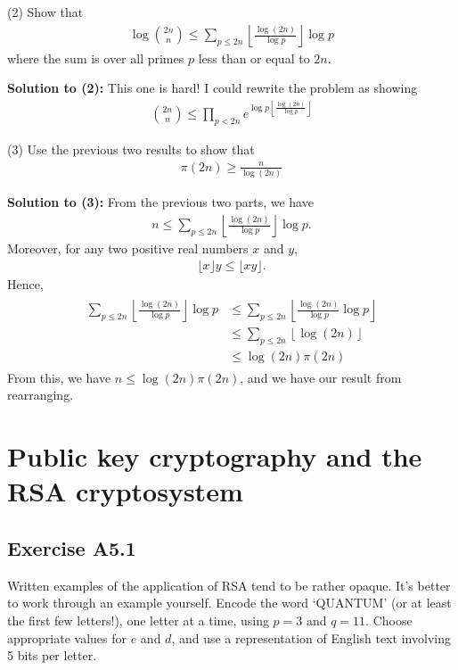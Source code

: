 \documentclass{book}
\begin{document}
    (2) Show that
    \begin{align}
        \log \binom{2n}{n} \leq \sum_{p\leq2n} \left\lfloor\frac{\log(2n)}{\log p} \right\rfloor\log p
    \end{align}
    where the sum is over all primes $p$ less than or equal to $2n$.

    \textbf{Solution to (2):} This one is hard! I could rewrite the problem as showing
    \begin{align}
        \binom{2n}{n} \leq \prod_{p<2n}e^{\log p \left\lfloor\frac{\log(2n)}{\log p}\right\rfloor}
    \end{align}

    (3) Use the previous two results to show that
    \begin{align}
        \pi(2n) \geq \frac{n}{\log(2n)}
    \end{align}

    \textbf{Solution to (3):} From the previous two parts, we have
    \begin{align}
        n \leq \sum_{p\leq2n} \left\lfloor\frac{\log(2n)}{\log p} \right\rfloor\log p.
    \end{align}
    Moreover, for any two positive real numbers $x$ and $y$,
    \begin{align}
        \lfloor x\rfloor y \leq \lfloor x y\rfloor.
    \end{align}
    Hence,
    \begin{align}
    \begin{aligned}
        \sum_{p\leq2n} \left\lfloor\frac{\log(2n)}{\log p} \right\rfloor\log p &\leq \sum_{p\leq2n} \left\lfloor\frac{\log(2n)}{\log p }\log p\right\rfloor \\
        &\leq \sum_{p\leq2n} \left\lfloor\log(2n)\right\rfloor\\
        &\leq \log(2n) \pi(2n)
    \end{aligned}
    \end{align}
    From this, we have $n \leq \log(2n) \pi(2n)$, and we have our result from rearranging.


\chapter{Public key cryptography and the RSA cryptosystem}


\section*{Exercise A5.1} 
    Written examples of the application of RSA tend to be rather opaque. It’s better to work through an example yourself. Encode the word ‘QUANTUM’ (or at least the first few letters!), one letter at a time, using $p=3$ and $q=11$. Choose appropriate values for $e$ and $d$, and use a representation of English text involving 5 bits per letter.
    
\end{document}
